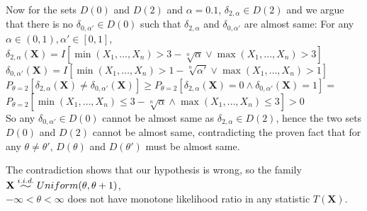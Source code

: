 Now for the sets $D(0)$ and $D(2)$ and $\alpha = 0.1$,
$\delta_{2, \alpha} \in D(2)$ and we argue that there is no $\delta_{0, \alpha'} \in D(0)$ such that $\delta_{2, \alpha}$ and $\delta_{0, \alpha'}$ are almost same: For any $\alpha \in (0, 1), \alpha' \in [0, 1]$,\\
$
\delta_{2, \alpha}(\mathbf{X}) = I[\min(X_1, \dots, X_n) > 3-\sqrt[n]{\alpha} \vee \max(X_1, \dots, X_n) > 3]
$
\\
$
\delta_{0, \alpha'}(\mathbf{X}) = I[\min(X_1, \dots, X_n) > 1-\sqrt[n]{\alpha'} \vee \max(X_1, \dots, X_n) > 1]
$
\\
$
P_{\theta=2}[\delta_{2, \alpha}(\mathbf{X}) \neq \delta_{0, \alpha'}(\mathbf{X})]
\geq
P_{\theta=2}[\delta_{2, \alpha}(\mathbf{X})=0 \wedge \delta_{0, \alpha'}(\mathbf{X})=1]
=
$
\\
$
P_{\theta=2}[
\min(X_1, \dots, X_n) \leq 3-\sqrt[n]{\alpha} \wedge \max(X_1, \dots, X_n) \leq 3
] > 0
$
\\
So any $\delta_{0, \alpha'} \in D(0)$ cannot be almost same as $\delta_{2, \alpha} \in D(2)$, hence the two sets $D(0)$ and $D(2)$ cannot be almost same, contradicting the proven fact that for any $\theta \neq \theta'$, $D(\theta)$ and $D(\theta')$ must be almost same.

The contradiction shows that our hypothesis is wrong, so the family $\mathbf{X} \widesim{i.i.d.} Uniform(\theta, \theta+1)$, \\
$-\infty < \theta < \infty$ does not have monotone likelihood ratio in any statistic $T(\mathbf{X})$.


